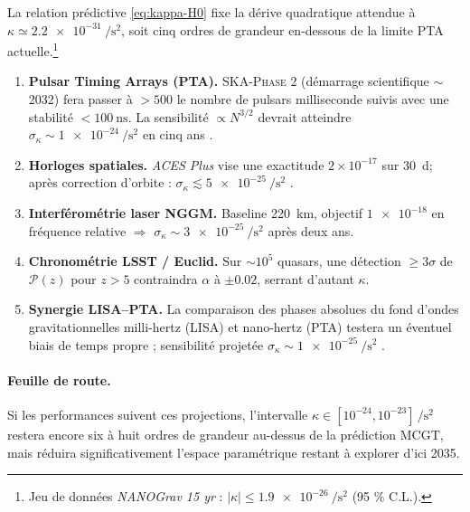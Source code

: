\documentclass[11pt]{article}
\begin{document}
La relation prédictive \eqref{eq:kappa-H0} fixe la dérive quadratique
attendue à
\(\kappa\simeq\SI{2.2e-31}{\per\square\second}\),
soit cinq ordres de grandeur en-dessous de la limite PTA actuelle.\footnote{%
  Jeu de données \emph{NANOGrav 15 yr} :  
  \(|\kappa|\le\SI{1.9e-26}{\per\square\second}\) (95 \% C.L.).}

\begin{enumerate}[label=\alph*)]
  \item \textbf{Pulsar Timing Arrays (PTA).}  
        \textsc{SKA-Phase 2} (démarrage scientifique \(\sim\) 2032) fera
        passer à \(>\!500\) le nombre de pulsars milliseconde suivis avec
        une stabilité \(<\SI{100}{\nano\second}\).
        La sensibilité \(\propto N^{3/2}\) devrait atteindre
        \(\sigma_{\kappa}\sim\SI{1e-24}{\per\square\second}\) en cinq ans
        \parencite{Janssen2015}.
  \item \textbf{Horloges spatiales.}  
        \emph{ACES Plus} vise une exactitude
        \(2\times10^{-17}\) sur \SI{30}{\day}; après correction
        d’orbite : \(\sigma_{\kappa}\lesssim
        \SI{5e-25}{\per\square\second}\) \parencite{Delva2022}.
  \item \textbf{Interférométrie laser NGGM.}  
        Baseline \SI{220}{\kilo\metre}, objectif
        \(\num{1e-18}{}\) en fréquence relative \(\Rightarrow\) 
        \(\sigma_{\kappa}\sim\SI{3e-25}{\per\square\second}\)
        après deux ans.
  \item \textbf{Chronométrie LSST / Euclid.}  
        Sur \(\sim10^{5}\) quasars, une détection \(\ge3\sigma\) de
        \(\mathcal P(z)\) pour \(z>5\) contraindra \(\alpha\) à
        \(\pm0.02\), serrant d’autant \(\kappa\).
  \item \textbf{Synergie LISA–PTA.}  
        La comparaison des phases absolues du fond d’ondes
        gravitationnelles milli-hertz (LISA) et nano-hertz (PTA)
        testera un éventuel biais de temps propre ; sensibilité projetée
        \(\sigma_{\kappa}\sim\SI{1e-25}{\per\square\second}\)
        \parencite{Sesana2019}.
\end{enumerate}

\paragraph{Feuille de route.}
Si les performances suivent ces projections, l’intervalle
\(\kappa\in[10^{-24},10^{-23}]\,\si{\per\square\second}\)
restera encore six à huit ordres de grandeur au-dessus de
la prédiction MCGT, mais réduira significativement l’espace
paramétrique restant à explorer d’ici 2035.
\end{document}
